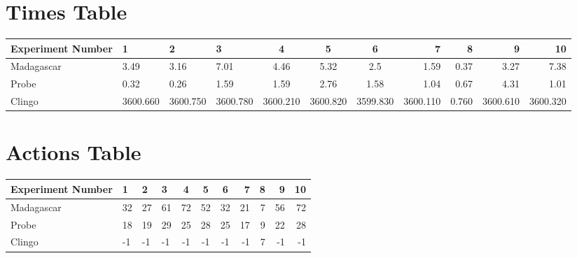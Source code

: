 \documentclass[8pt]{article}
\begin{document}
\begin{landscape}
\section{Times Table}\begin{tabular}{ | l | l | l | l | c | c | c | r | r | r | r | }\hline
Experiment Number & 1 & 2 & 3 & 4 & 5 & 6 & 7 & 8 & 9 & 10\\  \hline
Madagascar & 3.49 & 3.16 & 7.01 & 4.46 & 5.32 & 2.5 & 1.59 & 0.37 & 3.27 & 7.38\\  \hline
Probe & 0.32 & 0.26 & 1.59 & 1.59 & 2.76 & 1.58 & 1.04 & 0.67 & 4.31 & 1.01\\  \hline
Clingo & 3600.660 & 3600.750 & 3600.780 & 3600.210 & 3600.820 & 3599.830 & 3600.110 & 0.760 & 3600.610 & 3600.320\\  \hline
\end{tabular}
\section{Actions Table}\begin{tabular}{ | l | l | l | l | c | c | c | r | r | r | r | }\hline
Experiment Number & 1 & 2 & 3 & 4 & 5 & 6 & 7 & 8 & 9 & 10\\ \hline
 Madagascar & 32 & 27 & 61 & 72 & 52 & 32 & 21 & 7 & 56 & 72\\ \hline
 Probe & 18 & 19 & 29 & 25 & 28 & 25 & 17 & 9 & 22 & 28\\ \hline
 Clingo & -1 & -1 & -1 & -1 & -1 & -1 & -1 & 7 & -1 & -1\\ \hline
\end{tabular}
\end{landscape}
\end{document}
